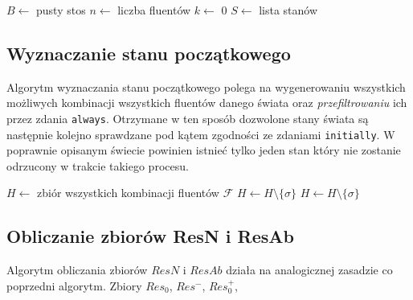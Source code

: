 \documentclass{article}
\begin{document}
\begin{algorithm}[H]
\begin{algorithmic}
\State $B \gets $ pusty stos
\State $n \gets $ liczba fluentów
\State $k \gets $ 0
\State $S \gets $ lista stanów
    \EndIf
	\State {}
	\State {}
	\State {}
	\State {}
	\State {}
	\State {}
	\State {}
\EndFunction
\end{algorithmic}
\end{algorithm}

\subsection{Wyznaczanie stanu początkowego}

Algorytm wyznaczania stanu początkowego polega na wygenerowaniu wszystkich możliwych kombinacji wszystkich fluentów danego świata oraz \emph{przefiltrowaniu} ich przez zdania \texttt{always}. Otrzymane w ten sposób dozwolone stany świata są następnie kolejno sprawdzane pod kątem zgodności ze zdaniami \texttt{initially}. W poprawnie opisanym świecie powinien istnieć tylko jeden stan który nie zostanie odrzucony w trakcie takiego procesu.

\begin{algorithm}[H]
\begin{algorithmic}
\State $H \gets $ zbiór wszystkich kombinacji fluentów $\mathcal{F}$
		\If{$\sigma \nvDash \alpha$}
			\State $H \gets H \setminus \{\sigma\}$
		\EndIf
	\EndFor
\EndFor
{}
		\If{$\sigma \nvDash \alpha$}
			\State $H \gets H \setminus \{\sigma\}$
		\EndIf
	\EndFor
\EndFor
\end{algorithmic}
\end{algorithm}

\subsection{Obliczanie zbiorów ResN i ResAb}

Algorytm obliczania zbiorów $ResN$ i $ResAb$ działa na analogicznej zasadzie co poprzedni algorytm. Zbiory $Res_0$, $Res^{-}$, $Res^{+}_{0}$, 
\end{document}
